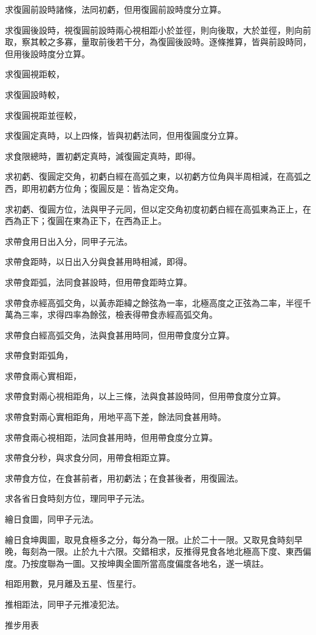 \begin{pinyinscope}
求復圓前設時諸條，法同初虧，但用復圓前設時度分立算。

求復圓後設時，視復圓前設時兩心視相距小於並徑，則向後取，大於並徑，則向前取，察其較之多寡，量取前後若干分，為復圓後設時。逐條推算，皆與前設時同，但用後設時度分立算。

求復圓視距較，

求復圓設時較，

求復圓視距並徑較，

求復圓定真時，以上四條，皆與初虧法同，但用復圓度分立算。

求食限總時，置初虧定真時，減復圓定真時，即得。

求初虧、復圓定交角，初虧白經在高弧之東，以初虧方位角與半周相減，在高弧之西，即用初虧方位角；復圓反是：皆為定交角。

求初虧、復圓方位，法與甲子元同，但以定交角初度初虧白經在高弧東為正上，在西為正下；復圓在東為正下，在西為正上。

求帶食用日出入分，同甲子元法。

求帶食距時，以日出入分與食甚用時相減，即得。

求帶食距弧，法同食甚設時，但用帶食距時立算。

求帶食赤經高弧交角，以黃赤距緯之餘弦為一率，北極高度之正弦為二率，半徑千萬為三率，求得四率為餘弦，檢表得帶食赤經高弧交角。

求帶食白經高弧交角，法與食甚用時同，但用帶食度分立算。

求帶食對距弧角，

求帶食兩心實相距，

求帶食對兩心視相距角，以上三條，法與食甚設時同，但用帶食度分立算。

求帶食對兩心實相距角，用地平高下差，餘法同食甚用時。

求帶食兩心視相距，法同食甚用時，但用帶食度分立算。

求帶食分秒，與求食分同，用帶食相距立算。

求帶食方位，在食甚前者，用初虧法；在食甚後者，用復圓法。

求各省日食時刻方位，理同甲子元法。

繪日食圖，同甲子元法。

繪日食坤輿圖，取見食極多之分，每分為一限。止於二十一限。又取見食時刻早晚，每刻為一限。止於九十六限。交錯相求，反推得見食各地北極高下度、東西偏度。乃按度聯為一圖。又按坤輿全圖所當高度偏度各地名，遂一填註。

相距用數，見月離及五星、恆星行。

推相距法，同甲子元推凌犯法。

推步用表


\end{pinyinscope}
